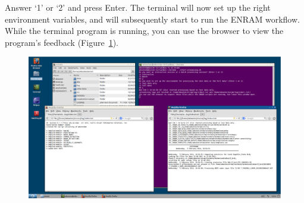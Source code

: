 Answer `1' or `2' and press Enter. The terminal will now set up the right environment variables, and will subsequently start to run the ENRAM workflow. While the terminal program is running, you can use the browser to view the program's feedback (Figure~\ref{fig:screenshot-26}).


\begin{figure}[ht]
  \centering
    \includegraphics[width=0.85\linewidth , keepaspectratio]{./../eps/screenshot-26.eps}
  \caption{}
  \label{fig:screenshot-26}
\end{figure}
